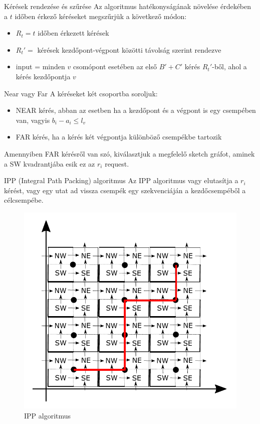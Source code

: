 \documentclass[10pt]{beamer}
\begin{document}
\begin{frame}{Kérések rendezése és szűrése}
	Az algoritmus hatékonyságának növelése érdekében a $t$ időben érkező kéréseket megszűrjük a következő módon:
	\begin{itemize}
		\item $ R_t = t $ időben érkezett kérések
		\item $ R_t' = $ kérések kezdőpont-végpont közötti távolság szerint rendezve
		\item input = minden $v$ csomópont esetében az első $B' + C'$ kérés $R_t'$-ből, ahol a kérés kezdőpontja $v$
	\end{itemize}
	
\end{frame}

\begin{frame}{Near vagy Far}
  A kéréseket két csoportba soroljuk:
  \begin{itemize}
  	\item NEAR kérés, abban az esetben ha a kezdőpont és a végpont is egy csempében van, vagyis $b_i - a_i \leq l_v$
  	\item FAR kérés, ha a kérés két végpontja különböző csempékbe tartozik
  \end{itemize}
  Amennyiben FAR kérésről van szó, kiválasztjuk a megfelelő sketch gráfot, aminek a SW kvadrantjába esik ez az $ r_i $ request.
\end{frame}

\begin{frame}{IPP (Integral Path Packing) algoritmus}
	Az IPP algoritmus \cite{buchbinder2006improved} vagy elutasítja a $ r_i $ kérést, vagy egy utat ad vissza csempék egy szekvenciáján a kezdőcsempéből a célcsempébe.
	\begin{figure}
		\centering \includegraphics[width=0.55\columnwidth]{Image/ipp}
		\caption{\label{fig:ipp}IPP algoritmus}
	\end{figure}
\end{frame}
\end{document}
